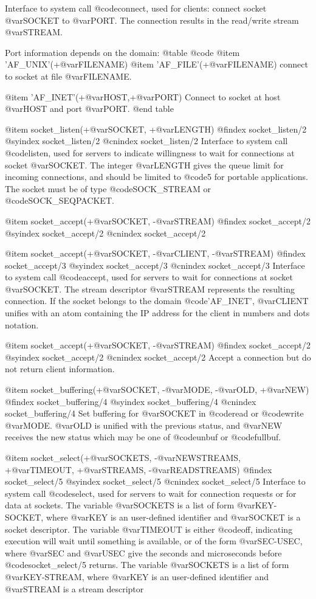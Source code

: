 {{{{{{Interface to system call @code{connect}, used for clients: connect
socket @var{SOCKET} to @var{PORT}. The connection results in the
read/write stream @var{STREAM}.

Port information depends on the domain:
@table @code
@item 'AF_UNIX'(+@var{FILENAME})
@item 'AF_FILE'(+@var{FILENAME})
connect to socket at file @var{FILENAME}.

@item 'AF_INET'(+@var{HOST},+@var{PORT})
Connect to socket at host @var{HOST} and port @var{PORT}.
@end table

@item socket_listen(+@var{SOCKET}, +@var{LENGTH})
@findex socket_listen/2
@syindex socket_listen/2
@cnindex socket_listen/2
Interface to system call @code{listen}, used for servers to indicate
willingness to wait for connections at socket @var{SOCKET}. The
integer @var{LENGTH} gives the queue limit for incoming connections,
and should be limited to @code{5} for portable applications. The socket
must be of type @code{SOCK_STREAM} or @code{SOCK_SEQPACKET}.

@item socket_accept(+@var{SOCKET}, -@var{STREAM})
@findex socket_accept/2
@syindex socket_accept/2
@cnindex socket_accept/2

@item socket_accept(+@var{SOCKET}, -@var{CLIENT}, -@var{STREAM})
@findex socket_accept/3
@syindex socket_accept/3
@cnindex socket_accept/3
Interface to system call @code{accept}, used for servers to wait for
connections at socket @var{SOCKET}. The stream descriptor @var{STREAM}
represents the resulting connection.  If the socket belongs to the
domain @code{'AF_INET'}, @var{CLIENT} unifies with an atom containing
the IP address for the client in numbers and dots notation.

@item socket_accept(+@var{SOCKET}, -@var{STREAM})
@findex socket_accept/2
@syindex socket_accept/2
@cnindex socket_accept/2
Accept a connection but do not return client information.

@item socket_buffering(+@var{SOCKET}, -@var{MODE}, -@var{OLD}, +@var{NEW})
@findex socket_buffering/4
@syindex socket_buffering/4
@cnindex socket_buffering/4
Set buffering for @var{SOCKET} in @code{read} or @code{write}
@var{MODE}. @var{OLD} is unified with the previous status, and @var{NEW}
receives the new status which may be one of @code{unbuf} or
@code{fullbuf}.

@item socket_select(+@var{SOCKETS}, -@var{NEWSTREAMS}, +@var{TIMEOUT}, +@var{STREAMS}, -@var{READSTREAMS})
@findex socket_select/5
@syindex socket_select/5
@cnindex socket_select/5
Interface to system call @code{select}, used for servers to wait for
connection requests or for data at sockets. The variable
@var{SOCKETS} is a list of form @var{KEY-SOCKET}, where @var{KEY} is
an user-defined identifier and @var{SOCKET} is a socket descriptor. The
variable @var{TIMEOUT} is either @code{off}, indicating execution will
wait until something is available, or of the form @var{SEC-USEC}, where
@var{SEC} and @var{USEC} give the seconds and microseconds before
@code{socket_select/5} returns. The variable @var{SOCKETS} is a list of
form @var{KEY-STREAM}, where @var{KEY} is an user-defined identifier
and @var{STREAM} is a stream descriptor

}}}}}}

